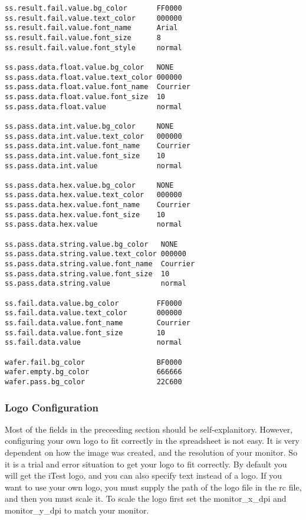\documentclass[letterpaper]{article}
\begin{document}
\begin{verbatim}
ss.result.fail.value.bg_color       FF0000
ss.result.fail.value.text_color     000000
ss.result.fail.value.font_name      Arial
ss.result.fail.value.font_size      8
ss.result.fail.value.font_style     normal

ss.pass.data.float.value.bg_color   NONE
ss.pass.data.float.value.text_color 000000
ss.pass.data.float.value.font_name  Courrier
ss.pass.data.float.value.font_size  10
ss.pass.data.float.value            normal

ss.pass.data.int.value.bg_color     NONE
ss.pass.data.int.value.text_color   000000
ss.pass.data.int.value.font_name    Courrier
ss.pass.data.int.value.font_size    10
ss.pass.data.int.value              normal

ss.pass.data.hex.value.bg_color     NONE
ss.pass.data.hex.value.text_color   000000
ss.pass.data.hex.value.font_name    Courrier
ss.pass.data.hex.value.font_size    10
ss.pass.data.hex.value              normal

ss.pass.data.string.value.bg_color   NONE
ss.pass.data.string.value.text_color 000000
ss.pass.data.string.value.font_name  Courrier
ss.pass.data.string.value.font_size  10
ss.pass.data.string.value            normal

ss.fail.data.value.bg_color         FF0000
ss.fail.data.value.text_color       000000
ss.fail.data.value.font_name        Courrier
ss.fail.data.value.font_size        10
ss.fail.data.value                  normal

wafer.fail.bg_color                 BF0000
wafer.empty.bg_color                666666
wafer.pass.bg_color                 22C600
\end{verbatim}
\clearpage

\subsubsection{Logo Configuration}
Most of the fields in the preceeding section should be self-explanitory.
However, configuring your own logo to fit correctly in the spreadsheet
is not easy.  It is very dependent on how the image was created,
and the resolution of your monitor.  So it is a trial and error
situation to get your logo to fit correctly.  By default you will
get the iTest logo, and you can also specify text instead of a logo.
If you want to use your own logo, you must supply the path of the logo
file in the rc file, and then you must scale it.  To scale the logo
first set the monitor\_x\_dpi and monitor\_y\_dpi to match your monitor.
\end{document}
